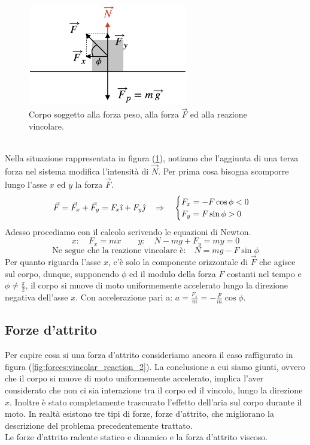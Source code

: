 \begin{figure}[htbp]
\center
        \includegraphics[width=7cm]{images/NPF.png}
        \caption{Corpo soggetto alla forza peso, alla forza $\vec F$ ed alla
        reazione vincolare.}
        \label{fig:vincolar_reaction_2}
\end{figure}
\\
Nella situazione rappresentata in figura (\ref{fig:vincolar_reaction_2}),
notiamo che l'aggiunta di una terza forza nel sistema modifica l'intensità
di $\vec N$. Per prima cosa bisogna scomporre lungo l'asse $x$ ed $y$ la
forza $\vec F$.
\begin{equation}
    \vec F = \vec F_x + \vec F_y = F_x\hat\imath + F_y\hat\jmath\quad\Rightarrow\quad 
    \begin{cases}
        F_x = -F\cos\phi <0\\
        F_y = F\sin\phi>0
    \end{cases}
\end{equation}
Adesso procediamo con il calcolo scrivendo le equazioni di Newton.
\begin{equation}
    x:\quad F_x = m\ddot x\qquad
    y:\quad N-mg+F_y = m\ddot y = 0
\end{equation}
\begin{equation}
    \mbox{Ne segue che la reazione vincolare è:}\quad \boxed{N = mg -F\sin\phi}
\end{equation}
Per quanto riguarda l'asse $x$, c'è solo la componente orizzontale di
$\vec F$ che agisce sul corpo, dunque, supponendo $\phi$ ed il modulo della
forza $F$ costanti nel tempo e $\phi\ne\frac\pi2$, il corpo si muove di moto
uniformemente accelerato lungo la direzione negativa dell'asse $x$.
Con accelerazione pari a: $a = \frac{F_x}{m} = -\frac Fm\cos\phi$.

\subsection{Forze d'attrito}
Per capire cosa si una forza d'attrito consideriamo ancora il caso raffigurato
in figura (\ref{fig:forces:vincolar_reaction_2}). La conclusione a cui siamo
giunti, ovvero che il corpo si
muove di moto uniformemente accelerato, implica l'aver considerato che non ci
sia interazione tra il corpo ed il vincolo, lungo la direzione $x$.
Inoltre è stato completamente trascurato l'effetto dell'aria sul corpo
durante il moto.
In realtà esistono tre tipi di forze, forze d'attrito, che migliorano la
descrizione del problema precedentemente trattato.\\
Le forze d'attrito radente statico e dinamico e la forza d'attrito viscoso.
